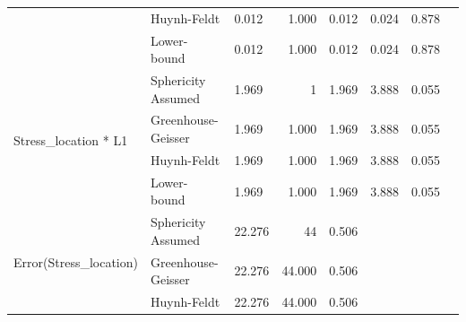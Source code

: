\documentclass[a4paper]{article}
\begin{document}
\begin{table}[H]
\begin{center}
\begin{tabular}{p{}p{}|l|r|r|r|r|r|}
\cline{2-7}
                                                        & Huynh-Feldt        & 0.012                                        & 1.000                   & 0.012                            & 0.024                  & 0.878                      \\ 
\cline{2-7}
                                                        & Lower-bound        & 0.012                                        & 1.000                   & 0.012                            & 0.024                  & 0.878                      \\ 
\hline
\multirow{4}{*}{Stress\_location * L1}                  & Sphericity Assumed & 1.969                                        & 1                       & 1.969                            & 3.888                  & 0.055                      \\ 
\cline{2-7}
                                                        & Greenhouse-Geisser & 1.969                                        & 1.000                   & 1.969                            & 3.888                  & 0.055                      \\ 
\cline{2-7}
                                                        & Huynh-Feldt        & 1.969                                        & 1.000                   & 1.969                            & 3.888                  & 0.055                      \\ 
\cline{2-7}
                                                        & Lower-bound        & 1.969                                        & 1.000                   & 1.969                            & 3.888                  & 0.055                      \\ 
\hline
\multirow{4}{*}{Error(Stress\_location)}                & Sphericity Assumed & 22.276                                       & 44                      & 0.506                            & \multicolumn{1}{l|}{~} & \multicolumn{1}{l|}{~}     \\ 
\cline{2-7}
                                                        & Greenhouse-Geisser & 22.276                                       & 44.000                  & 0.506                            & \multicolumn{1}{l|}{~} & \multicolumn{1}{l|}{~}     \\ 
\cline{2-7}
                                                        & Huynh-Feldt        & 22.276                                       & 44.000                  & 0.506                            & \multicolumn{1}{l|}{~} & \multicolumn{1}{l|}{~}     \\ 

\end{tabular}
\end{center}
\end{table}
\end{document}
